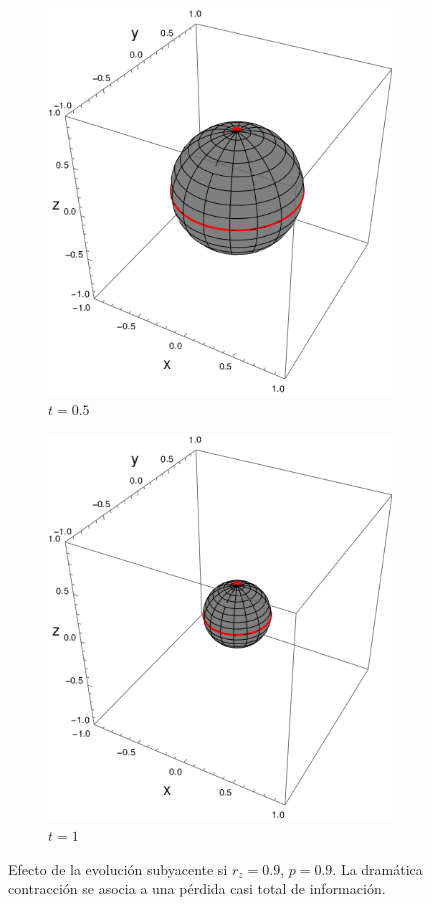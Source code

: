 \begin{figure}[ht!]
\begin{subfigure}{0.32\textwidth}
    \includegraphics[width=0.9\linewidth]{chapter3/figures_toy/sphere_swapcontraction_t=0.5_z=0.9_p=0.9.png}
    \caption{$t=0.5$}
  \end{subfigure}
  \begin{subfigure}{0.32\textwidth}
    \centering
    \includegraphics[width=0.9\linewidth]{chapter3/figures_toy/sphere_swapcontraction_t=1.0_z=0.9_p=0.9.png}
    \caption{$t=1$}
  \end{subfigure}
  \caption{Efecto de la evolución subyacente si $r_{z}=0.9$, $p=0.9$. La dramática contracción se asocia a una pérdida casi total de información.}
  \label{fig:SWAPFactorSequence}
  \end{figure}

